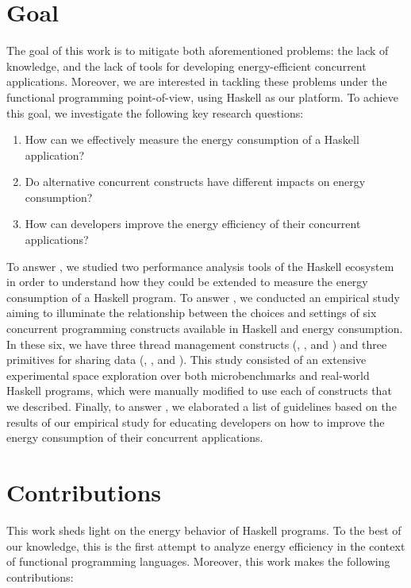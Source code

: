 \section{Goal}
The goal of this work is to mitigate both aforementioned problems: the lack of knowledge, and the lack of tools for developing energy-efficient concurrent applications. Moreover, we are interested in tackling these problems under the functional programming point-of-view, using Haskell as our platform. To achieve this goal, we investigate the following key research questions:

\begin{enumerate}[label=\RQ{\arabic*}.]
  \item How can we effectively measure the energy consumption of a Haskell application?
  \item Do alternative concurrent constructs have different impacts on energy consumption?
  \item How can developers improve the energy efficiency of their concurrent applications?
\end{enumerate}

To answer , we studied two performance analysis tools of the Haskell ecosystem in order to understand how they could be extended to measure the energy consumption of a Haskell program. To answer , we conducted an empirical study aiming to illuminate the relationship between the choices and settings of six concurrent programming constructs available in Haskell and energy consumption. In these six, we have three thread management constructs (\forkIO, \forkOn, and \forkOS) and three primitives for sharing data (\MVar, \TMVar, and \TVar). This study consisted of an extensive experimental space exploration over both microbenchmarks and real-world Haskell programs, which were manually modified to use each of constructs that we described. Finally, to answer , we elaborated a list of guidelines based on the results of our empirical study for educating developers on how to improve the energy consumption of their concurrent applications.


\section{Contributions}
This work sheds light on the energy behavior of Haskell programs. To the best of our knowledge, this is the first attempt to analyze energy efficiency in the context of functional programming languages. Moreover, this work makes the following contributions:

